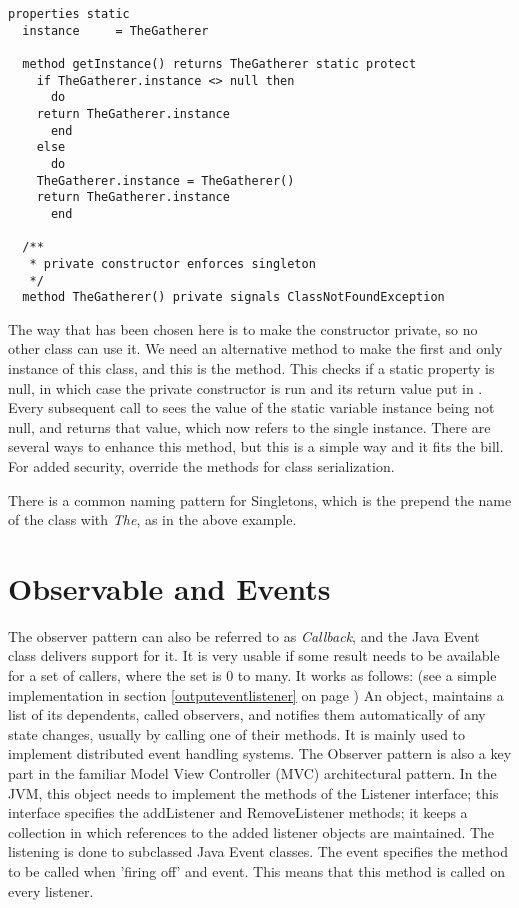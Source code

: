 {\begin{lstlisting}[label=singleton1,caption=Singleton]
  properties static
  instance     = TheGatherer

  method getInstance() returns TheGatherer static protect
    if TheGatherer.instance <> null then
      do
	return TheGatherer.instance
      end
    else
      do
	TheGatherer.instance = TheGatherer()
	return TheGatherer.instance
      end
    
  /**
   * private constructor enforces singleton
   */
  method TheGatherer() private signals ClassNotFoundException
\end{lstlisting}
The way that has been chosen here is to make the constructor private,
so no other class can use it. We need an alternative method to make the first
and only instance of this class, and this is the 
method. This checks if a static property  is null, in
which case the private constructor is run and its return value put in
. Every subsequent call to  sees
the value of the static variable instance being not null, and returns
that value, which now refers to the single instance. There are several
ways to enhance this method, but this is a simple way and it fits the
bill. For added security, override the methods for class
serialization.

There is a common naming pattern for Singletons, which is the prepend
the name of the class with \emph{The}, as in the above example.
\section{Observable and Events}\label{events}
The observer pattern can also be referred to as \emph{Callback}, and
the Java Event class delivers support for it. It is very usable if
some result needs to be available for a set of callers, where the set
is 0 to many. It works as follows: (see a simple implementation in
section \ref{outputeventlistener} on page
\pageref{outputeventlistener})
An object, maintains a list of its dependents, called observers, and
notifies them automatically of any state changes, usually by calling
one of their methods. It is mainly used to implement distributed event
handling systems. The Observer pattern is also a key part in the
familiar Model View Controller (MVC) architectural pattern. In the
JVM, this object needs to implement the methods of the Listener
interface; this interface specifies the addListener and RemoveListener
methods; it keeps a collection in which references to the added
listener objects are maintained. The listening is done to subclassed
Java Event classes. The event specifies the method to be called when
'firing off' and event. This means that this method is called on every
listener.

}
